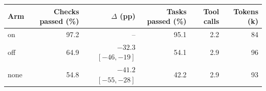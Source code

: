 \begin{tabular}{lrrrrr}
\toprule
Arm & Checks passed (\%) & $\Delta$ (pp) & Tasks passed (\%) & Tool calls & Tokens (k) \\
\midrule
on & 97.2 & -- & 95.1 & 2.2 & 84 \\
off & 64.9 & $-32.3$ $[-46, -19]$ & 54.1 & 2.9 & 96 \\
none & 54.8 & $-41.2$ $[-55, -28]$ & 42.2 & 2.9 & 93 \\
\bottomrule
\end{tabular}
